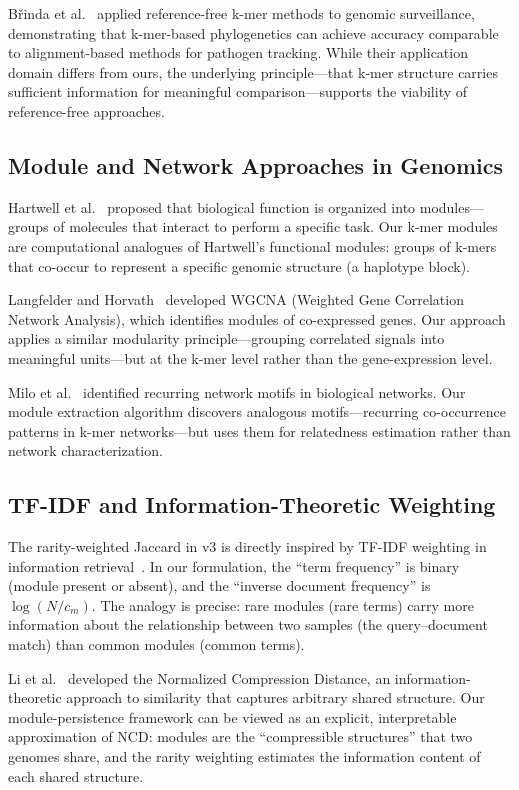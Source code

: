 \documentclass{../yalumba}
\begin{document}
B\v{r}inda et al.~\cite{brinda2023phylogenetic} applied reference-free
k-mer methods to genomic surveillance, demonstrating that k-mer-based
phylogenetics can achieve accuracy comparable to alignment-based methods for
pathogen tracking.  While their application domain differs from ours, the
underlying principle---that k-mer structure carries sufficient information for
meaningful comparison---supports the viability of reference-free approaches.

\subsection{Module and Network Approaches in Genomics}

Hartwell et al.~\cite{hartwell1999cell} proposed that biological function
is organized into modules---groups of molecules that interact to perform a
specific task.  Our k-mer modules are computational analogues of Hartwell's
functional modules: groups of k-mers that co-occur to represent a specific
genomic structure (a haplotype block).

Langfelder and Horvath~\cite{langfelder2008wgcna} developed WGCNA (Weighted
Gene Correlation Network Analysis), which identifies modules of co-expressed
genes.  Our approach applies a similar modularity principle---grouping
correlated signals into meaningful units---but at the k-mer level rather than
the gene-expression level.

Milo et al.~\cite{milo2002network} identified recurring network motifs in
biological networks.  Our module extraction algorithm discovers analogous
motifs---recurring co-occurrence patterns in k-mer networks---but uses them
for relatedness estimation rather than network characterization.

\subsection{TF-IDF and Information-Theoretic Weighting}

The rarity-weighted Jaccard in v3 is directly inspired by TF-IDF weighting
in information retrieval~\cite{salton1988tfidf}.  In our formulation, the
``term frequency'' is binary (module present or absent), and the ``inverse
document frequency'' is $\log(N/c_m)$.  The analogy is precise: rare modules
(rare terms) carry more information about the relationship between two
samples (the query--document match) than common modules (common terms).

Li et al.~\cite{li2004ncd} developed the Normalized Compression Distance,
an information-theoretic approach to similarity that captures arbitrary
shared structure.  Our module-persistence framework can be viewed as an
explicit, interpretable approximation of NCD: modules are the ``compressible
structures'' that two genomes share, and the rarity weighting estimates
the information content of each shared structure.
\end{document}
